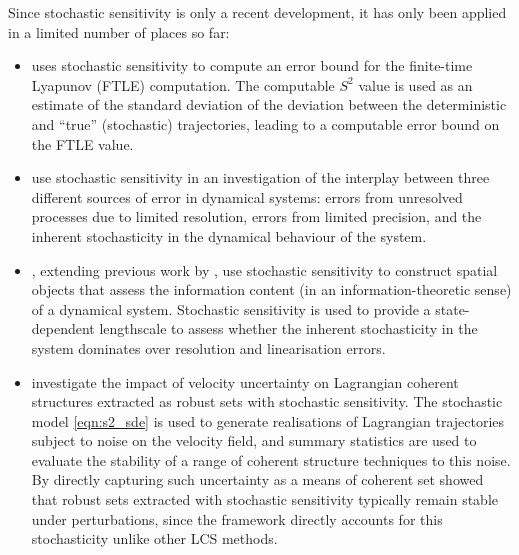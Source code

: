 Since stochastic sensitivity is only a recent development, it has only been applied in a limited number of places so far:
\begin{itemize}
	\item \citet{Balasuriya_2020_UncertaintyFinitetimeLyapunov} uses stochastic sensitivity to compute an error bound for the finite-time Lyapunov (FTLE) computation.
	      The computable \(S^2\) value is used as an estimate of the standard deviation of the deviation between the deterministic and ``true'' (stochastic) trajectories, leading to a computable error bound on the FTLE value.

	\item \citet{FangEtAl_2020_DisentanglingResolutionPrecision} use stochastic sensitivity in an investigation of the interplay between three different sources of error in dynamical systems: errors from unresolved processes due to limited resolution, errors from limited precision, and the inherent stochasticity in the dynamical behaviour of the system.

	\item \citet{FangOuellette_2021_AssessingInformationContent}, extending previous work by \citet{FangEtAl_2019_LocalLinearityCoherent}, use stochastic sensitivity to construct spatial objects that assess the information content (in an information-theoretic sense) of a dynamical system.
	      Stochastic sensitivity is used to provide a state-dependent lengthscale to assess whether the inherent stochasticity in the system dominates over resolution and linearisation errors.

	\item \citet{BadzaEtAl_2023_HowSensitiveAre} investigate the impact of velocity uncertainty on Lagrangian coherent structures extracted as robust sets with stochastic sensitivity.
	      The stochastic model \cref{eqn:s2_sde} is used to generate realisations of Lagrangian trajectories subject to noise on the velocity field, and summary statistics are used to evaluate the stability of a range of coherent structure techniques to this noise.
	      By directly capturing such uncertainty as a means of coherent set \citet{BadzaEtAl_2023_HowSensitiveAre} showed that robust sets extracted with stochastic sensitivity typically remain stable under perturbations, since the framework directly accounts for this stochasticity unlike other LCS methods.

\end{itemize}

